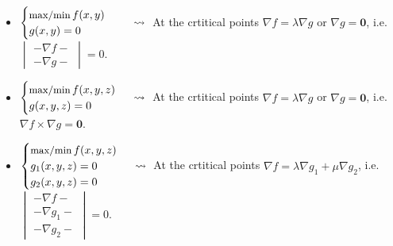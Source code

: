 \documentclass{article}
\newcommand{\Tr}[2]{#1}
\newcommand\bdzero{\mathbf 0}
\begin{document}
\begin{itemize}

\item $\begin{cases}\mbox{\small max/min}\, f(x,y)\hphantom{,z}\\
    g(x,y)=0
    \end{cases}
    \;\rightsquigarrow\;
    $
    \Tr{At the crtitical points}
       {I de kritiska punkterna är}
    $\nabla f=\lambda\nabla g$\/
    \Tr{or}
       {eller}
    $\nabla g=\bdzero$,
    \Tr{i.e.}
       {dvs}
    $\begin{vmatrix}-\nabla f -\\ -\nabla g -\end{vmatrix}=0$.

  \item $\begin{cases}\mbox{\small max/min}\, f(x,y,z)\\
      g(x,y,z)=0
    \end{cases}
    \;\rightsquigarrow\;
    $
    \Tr{At the crtitical points }
       {I de kritiska punkterna är}
    $\nabla f=\lambda\nabla g$\/
    \Tr{or}
       {eller}
    $\nabla g=\bdzero$,
    \Tr{i.e.}
       {dvs}
    $\nabla f\times\nabla g=\bdzero$.

  \item $\begin{cases}\mbox{\small max/min}\, f(x,y,z)\cr
      g_1(x,y,z)=0\\
      g_2(x,y,z)=0
    \end{cases}
    \;\rightsquigarrow\;
    $
    \Tr{At the crtitical points }
       {I de kritiska punkterna är}
    $\nabla f=\lambda\nabla g_1+\mu\nabla g_2$,
    \Tr{i.e.}
       {dvs}
    $\begin{vmatrix}-\nabla f -\\ -\nabla g_1 -\\ -\nabla g_2 - \end{vmatrix}=0$.


\end{itemize}
\end{document}
